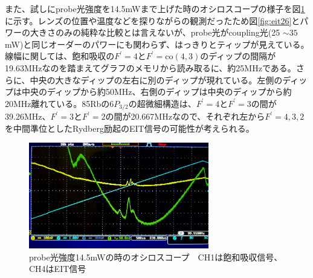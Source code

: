 \documentclass[dvipdfmx]{jsreport}
\begin{document}
また、試しにprobe光強度を14.5mWまで上げた時のオシロスコープの様子を図\ref{fig:eit-high}に示す。レンズの位置や温度などを探りながらの観測だったため図\ref{fig:eit26}とパワーの大きさのみの純粋な比較とは言えないが、probe光がcoupling光(25 $\sim 35$mW)と同じオーダーのパワーにも関わらず、はっきりとティップが見えている。線幅に関しては、飽和吸収の$F^{'} = 4$と$F^{'} = \text{co}(4,3)$のディップの間隔が19.63MHzなのを踏まえてグラフのメモリから読み取るに、約25MHzである。さらに、中央の大きなディップの左右に別のディップが現れている。左側のディップは中央のディップから約50MHz、右側のディップは中央のディップから約20MHz離れている。85Rbの$6P_{3/2}$の超微細構造は、$F^{'} = 4$と$F^{'} = 3$の間が39.26MHz、$F^{'} = 3$と$F^{'} = 2$の間が20.667MHzなので\cite{hyperfine}、それぞれ左から$F^{'} = 4,3,2$を中間準位としたRydberg励起のEIT信号の可能性が考えられる。
\begin{figure}[hbtp]
\centering
\includegraphics[width=0.7\textwidth]{images/eit_high.jpg}
\caption{\label{fig:eit-high}probe光強度14.5mWの時のオシロスコープ　CH1は飽和吸収信号、CH4はEIT信号}
\end{figure}
\end{document}
